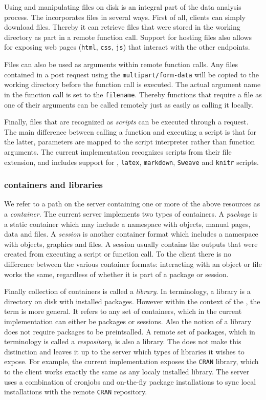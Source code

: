 Using and manipulating files on disk is an integral part of the data analysis process. The \API incorporates files in several ways. First of all, clients can simply download files. Thereby it can retrieve files that were stored in the working directory as part in a remote function call. Support for hosting files also allows for exposing web pages (\texttt{html}, \texttt{css}, \texttt{js}) that interact with the other \API endpoints. 

Files can also be used as arguments within remote function calls. Any files contained in a post request using the \texttt{multipart/form-data} will be copied to the working directory before the function call is executed. The actual argument name in the function call is set to the \texttt{filename}. Thereby functions that require a file as one of their arguments can be called remotely just as easily as calling it locally. 

Finally, files that are recognized as \emph{scripts} can be executed through a \POST request. The main difference between calling a function and executing a script is that for the latter, \HTTP parameters are mapped to the script interpreter rather than function arguments. The current \OpenCPU implementation recognizes scripts from their file extension, and includes support for \R, \texttt{latex}, \texttt{markdown}, \texttt{Sweave} and \texttt{knitr} scripts. 


\subsubsection{containers and libraries}
 
We refer to a path on the server containing one or more of the above resources as a \emph{container}. The current \OpenCPU server implements two types of containers. A \emph{package} is a static container which may include a namespace with objects, manual pages, data and files. A \emph{session} is another container format which includes a namespace with objects, graphics and files. A session usually contains the outputs that were created from executing a script or function call. To the client there is no difference between the various container formats: interacting with an object or file works the same, regardless of whether it is part of a package or session.

Finally collection of containers is called a \emph{library}. In \R terminology, a library is a directory on disk with installed packages. However within the context of the \API, the term is more general. It refers to any set of containers, which in the current implementation can either be packages or sessions. Also the \API notion of a library does not require packages to be preintsalled. A remote set of packages, which in \R terminology is called a \emph{respository}, is also a library. The \API does not make this distinction and leaves it up to the server which types of libraries it wishes to expose. For example, the current implementation exposes the \texttt{CRAN} library, which to the client works exactly the same as any localy installed library. The server uses a combination of cronjobs and on-the-fly package installations to sync local installations with the remote \texttt{CRAN} repository. 



